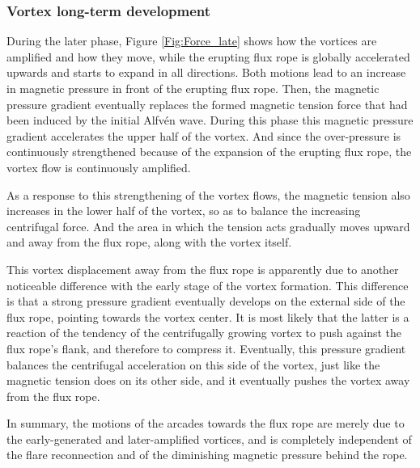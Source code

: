 \documentclass[apj]{emulateapj}
\begin{document}
 \subsubsection{Vortex long-term development}
 \label{Vortex-long}

During the later phase, Figure \ref{Fig:Force_late} shows how the vortices are amplified and how they move, while the erupting flux rope is globally accelerated upwards and starts to expand in all directions. Both motions lead to an increase in magnetic pressure in front of the erupting flux rope.  Then, the magnetic pressure gradient eventually replaces the formed magnetic tension force that had been induced by the initial Alfv\'{e}n wave. During this phase this magnetic pressure gradient accelerates the upper half of the vortex. And since the over-pressure  is continuously strengthened because of the expansion of the  erupting flux rope, the vortex flow is continuously amplified. 

As a response to this strengthening of the vortex flows, the magnetic tension also increases in the lower half of the vortex, so as to balance the increasing centrifugal force. And the area in which the tension acts gradually moves upward and away from the flux rope, along with the vortex itself. 

This vortex displacement away from the flux rope is apparently due to another noticeable difference with the early stage of the vortex formation. This difference is that a strong pressure gradient eventually develops on the external side of the flux rope, pointing towards the vortex center. It is most likely that the latter is a reaction of the tendency of the centrifugally growing vortex to push against the flux rope's flank, and therefore to compress it. Eventually, this pressure gradient balances the centrifugal acceleration on this side of the vortex, just like the magnetic tension does on its other side, and it eventually pushes the vortex away from the flux rope. 

In summary, the motions of the arcades towards the flux rope are merely due to the early-generated and later-amplified vortices, and is completely independent of the flare reconnection and of the diminishing magnetic pressure behind the rope.
\end{document}
